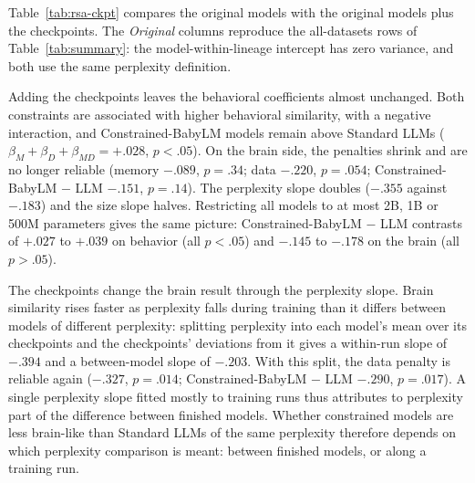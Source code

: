 

Table~\ref{tab:rsa-ckpt} compares the original models with the original models plus the checkpoints. The \emph{Original} columns reproduce the all-datasets rows of Table~\ref{tab:summary}: the model-within-lineage intercept has zero variance, and both use the same perplexity definition.

Adding the checkpoints leaves the behavioral coefficients almost unchanged. Both constraints are associated with higher behavioral similarity, with a negative interaction, and Constrained-BabyLM models remain above Standard LLMs ($\beta_M+\beta_D+\beta_{MD}=+.028$, $p<.05$). On the brain side, the penalties shrink and are no longer reliable (memory $-.089$, $p=.34$; data $-.220$, $p=.054$; Constrained-BabyLM $-$ LLM $-.151$, $p=.14$). The perplexity slope doubles ($-.355$ against $-.183$) and the size slope halves. Restricting all models to at most 2B, 1B or 500M parameters gives the same picture: Constrained-BabyLM $-$ LLM contrasts of $+.027$ to $+.039$ on behavior (all $p<.05$) and $-.145$ to $-.178$ on the brain (all $p>.05$).

The checkpoints change the brain result through the perplexity slope. Brain similarity rises faster as perplexity falls during training than it differs between models of different perplexity: splitting perplexity into each model's mean over its checkpoints and the checkpoints' deviations from it gives a within-run slope of $-.394$ and a between-model slope of $-.203$. With this split, the data penalty is reliable again ($-.327$, $p=.014$; Constrained-BabyLM $-$ LLM $-.290$, $p=.017$). A single perplexity slope fitted mostly to training runs thus attributes to perplexity part of the difference between finished models. Whether constrained models are less brain-like than Standard LLMs of the same perplexity therefore depends on which perplexity comparison is meant: between finished models, or along a training run.
